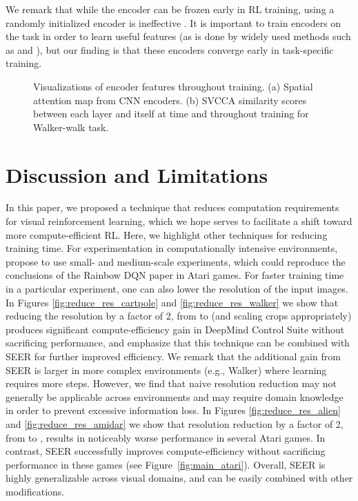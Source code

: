 \documentclass{article}
\begin{document}
We remark that while the encoder can be frozen early in RL training, using a randomly initialized encoder is ineffective \citep{stooke2021decoupling}. It is important to train encoders on the task in order to learn useful features (as is done by widely used methods such as \citet{srinivas2020curl} and \citet{laskin2020reinforcement}), but our finding is that these encoders converge early in task-specific training.

\begin{figure} [ht] \centering
{} 
\caption{Visualizations of encoder features throughout training. (a) Spatial attention map from CNN encoders. (b) SVCCA \citep{46337} similarity scores between each layer and itself at time  and  throughout training for Walker-walk task.} \label{fig:viz}
\end{figure}

\section{Discussion and Limitations} \label{discussion}
In this paper, we proposed a technique that reduces computation requirements for visual reinforcement learning, which we hope serves to facilitate a shift toward more compute-efficient RL. Here, we highlight other techniques for reducing training time. For experimentation in computationally intensive environments, \citet{obando2020revisiting} propose to use small- and medium-scale experiments, which could reproduce the conclusions of the Rainbow DQN paper in Atari games. For faster training time in a particular experiment, one can also lower the resolution of the input images. In Figures \ref{fig:reduce_res_cartpole} and \ref{fig:reduce_res_walker} we show that reducing the resolution by a factor of 2, from  to  (and scaling crops appropriately) produces significant compute-efficiency gain in DeepMind Control Suite without sacrificing performance, and emphasize that this technique can be combined with SEER for further improved efficiency. We remark that the additional gain from SEER is larger in more complex environments (e.g., Walker) where learning requires more steps. However, we find that naive resolution reduction may not generally be applicable across environments and may require domain knowledge in order to prevent excessive information loss. In Figures \ref{fig:reduce_res_alien} and \ref{fig:reduce_res_amidar} we show that resolution reduction by a factor of 2, from  to , results in noticeably worse performance in several Atari games. In contrast, SEER successfully improves compute-efficiency without sacrificing performance in these games (see Figure~\ref{fig:main_atari}). Overall, SEER is highly generalizable across visual domains, and can be easily combined with other modifications.
\end{document}
